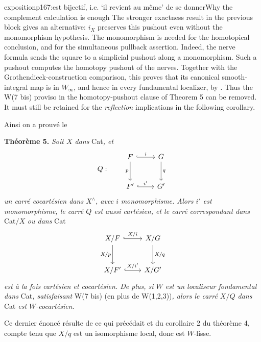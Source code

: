 \begin{dcomment}{exposition}{p167:est bijectif, i.e. ‘il revient au même’ de se donner}{Why the complement calculation is enough}
The stronger exactness result in the previous block gives an alternative: $i_X$ preserves this pushout even without the monomorphism hypothesis. The monomorphism is needed for the homotopical conclusion, and for the simultaneous pullback assertion. Indeed, the nerve formula sends the square to a simplicial pushout along a monomorphism. Such a pushout computes the homotopy pushout of the nerves. Together with the Grothendieck-construction comparison, this proves that its canonical smooth-integral map is in $W_\infty$, and hence in every fundamental localizer, by \citet[Corollary 4.2.19]{Cisinski2006}. Thus the W(7 bis) proviso in the homotopy-pushout clause of Theorem 5 can be removed. It must still be retained for the \emph{reflection} implications in the following corollary.
\end{dcomment}


Ainsi on a prouvé le

\textbf{Théorème 5.} \textit{Soit $X$ dans} Cat\textit{, et}
\[
Q : \qquad
\begin{tikzcd}[row sep=large, baseline=(current bounding box.center)]
F \arrow[r, hook, "i"] \arrow[d, "p"'] & G \arrow[d, "q"] \\
F' \arrow[r, hook, "i'"] & G'
\end{tikzcd}
\]
\textit{un carré cocartésien dans $X^\wedge$, avec $i$} \textit{monomorphisme. Alors $i'$ est} \textit{monomorphisme, le carré $Q$ est aussi cartésien, et le carré correspondant dans} Cat$/X$ \textit{ou dans} Cat
\[
\begin{tikzcd}[row sep=large]
X/F \arrow[r, hook, "X/i"] \arrow[d, "X/p"'] & X/G \arrow[d, "X/q"] \\
X/F' \arrow[r, hook, "X/i'"] & X/G'
\end{tikzcd}
\]
 \textit{est à la fois cartésien et cocartésien. De plus, si $W$ est un localiseur fondamental dans} Cat\textit{, satisfaisant} W(7 bis) (en plus de W(1,2,3))\textit{, alors le carré $X/Q$ dans} Cat \textit{est $W$-cocartésien.}

Ce dernier énoncé résulte de ce qui précédait et du corollaire 2 du théorème 4, compte tenu que $X/q$ est un isomorphisme local, donc est $W$-lisse.

